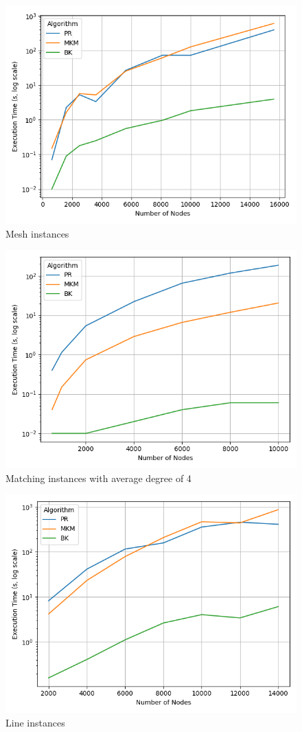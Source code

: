 \begin{figure}[htbp]
    \centering
    \includegraphics[width=0.8\linewidth]{figures/mesh.png}
    \caption{Mesh instances}
    \label{fig:mesh}
\end{figure}

\begin{figure}[htbp]
    \centering
    \includegraphics[width=0.8\linewidth]{figures/matching.png}
    \caption{Matching instances with average degree of 4}
    \label{fig:matching}
\end{figure}

\begin{figure}[htbp]
    \centering
    \includegraphics[width=0.8\linewidth]{figures/line.png}
    \caption{Line instances}
    \label{fig:line}
\end{figure}

